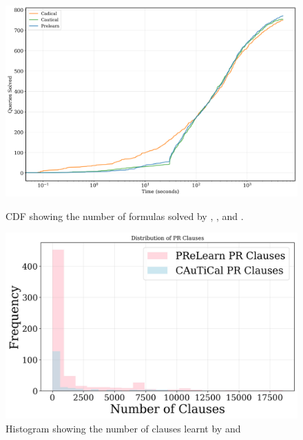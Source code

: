 \begin{figure}[!ht]
    \centering
    \begin{minipage}[b]{0.45\textwidth}
        \centering
        \includegraphics[width=\textwidth]{figs/cdf.png}
        \caption{CDF showing the number of formulas solved by \tool, \prelearn, and \cadical.}
        \label{fig:cdf}
    \end{minipage}
    \hspace{0.06\textwidth}
    \begin{minipage}[b]{0.45\textwidth}
        \centering
        \includegraphics[width=\textwidth]{figs/clauses_histogram.jpg}
        \caption{Histogram showing the number of \pr clauses learnt by \tool and \prelearn}
        \label{fig:clauses-histogram}
    \end{minipage}
\end{figure}

